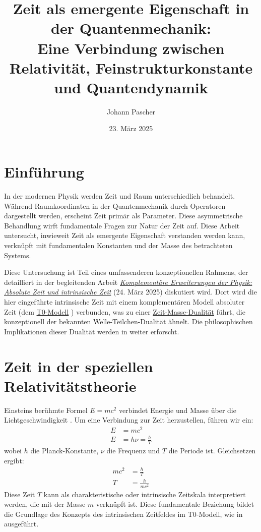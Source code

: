 \documentclass[12pt,a4paper]{article}
\title{Zeit als emergente Eigenschaft in der Quantenmechanik: \\Eine Verbindung zwischen Relativität, Feinstrukturkonstante und Quantendynamik}
\author{Johann Pascher}
\date{23. März 2025}
\begin{document}
	
	\maketitle
	
	\tableofcontents
	\newpage
	
	\section{Einführung}
	In der modernen Physik werden Zeit und Raum unterschiedlich behandelt. Während Raumkoordinaten in der Quantenmechanik durch Operatoren dargestellt werden, erscheint Zeit primär als Parameter. Diese asymmetrische Behandlung wirft fundamentale Fragen zur Natur der Zeit auf. Diese Arbeit untersucht, inwieweit Zeit als emergente Eigenschaft verstanden werden kann, verknüpft mit fundamentalen Konstanten und der Masse des betrachteten Systems.
	
	Diese Untersuchung ist Teil eines umfassenderen konzeptionellen Rahmens, der detailliert in der begleitenden Arbeit \href{https://github.com/jpascher/T0-Time-Mass-Duality/tree/main/2/pdf/Deutsch/KomplementPhysikZeit.pdf}{\textit{Komplementäre Erweiterungen der Physik: Absolute Zeit und intrinsische Zeit}} \cite{pascher_komplementaer_2025} (24. März 2025) diskutiert wird. Dort wird die hier eingeführte intrinsische Zeit mit einem komplementären Modell absoluter Zeit (dem \href{https://github.com/jpascher/T0-Time-Mass-Duality/tree/main/2/pdf/Deutsch/ZeitMasseT0Params.pdf}{T0-Modell} \cite{pascher_params_2025}) verbunden, was zu einer \href{https://github.com/jpascher/T0-Time-Mass-Duality/tree/main/2/pdf/Deutsch/MathZeitMasseLagrange.pdf}{Zeit-Masse-Dualität} \cite{pascher_lagrange_2025} führt, die konzeptionell der bekannten Welle-Teilchen-Dualität ähnelt. Die philosophischen Implikationen dieser Dualität werden in \cite{pascher_zeit_masse_2025} weiter erforscht.
	
	\section{Zeit in der speziellen Relativitätstheorie}
	Einsteins berühmte Formel \( E = mc^2 \) verbindet Energie und Masse über die Lichtgeschwindigkeit \cite{einstein}. Um eine Verbindung zur Zeit herzustellen, führen wir ein:
	\begin{align}
		E &= mc^2 \\
		E &= h\nu = \frac{h}{T}
	\end{align}
	wobei \( h \) die Planck-Konstante, \( \nu \) die Frequenz und \( T \) die Periode ist. Gleichsetzen ergibt:
	\begin{align}
		mc^2 &= \frac{h}{T} \\
		T &= \frac{h}{mc^2}
	\end{align}
	Diese Zeit \( T \) kann als charakteristische oder intrinsische Zeitskala interpretiert werden, die mit der Masse \( m \) verknüpft ist. Diese fundamentale Beziehung bildet die Grundlage des Konzepts des intrinsischen Zeitfeldes im T0-Modell, wie in \cite{pascher_lagrange_2025} ausgeführt.
	
\end{document}
